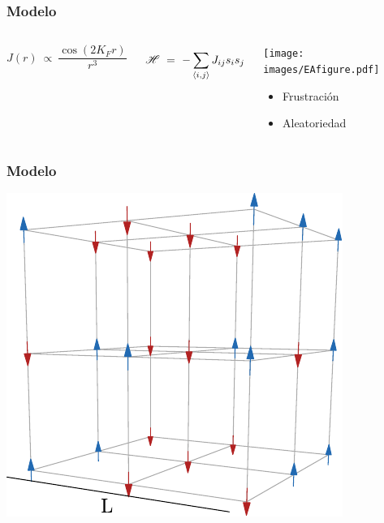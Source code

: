 \documentclass{beamer}
\newcommand{\sub}[1]{ _{{\scriptscriptstyle \mathit{#1}}}  }
\newcommand{\Ham}{\mathscr{H}}
\begin{document}
\begin{frame}
  \frametitle{Modelo}

  \pause

  \begin{columns}


    \begin{equation*}
      J(r) \ ∝ \ \frac{\cos(2K\sub{F} r)}{r^3}
    \end{equation*}

    \pause

    \begin{equation*}
      \Ham \ = \  - \sum_{\expval{i,j}} J_{ij} s_i s_j
    \end{equation*}

    \pause


    \begin{center}
      \texttt{[image: images/EAfigure.pdf]}
      \begin{itemize}
      \item Frustración
      \item Aleatoriedad
      \end{itemize}
    \end{center}

  \end{columns}

\end{frame}

\begin{frame}
  \frametitle{Modelo}
  \begin{center}
    \includegraphics{../study_cases/gridplot/gridplot.pdf}
  \end{center}
\end{frame}
\end{document}
